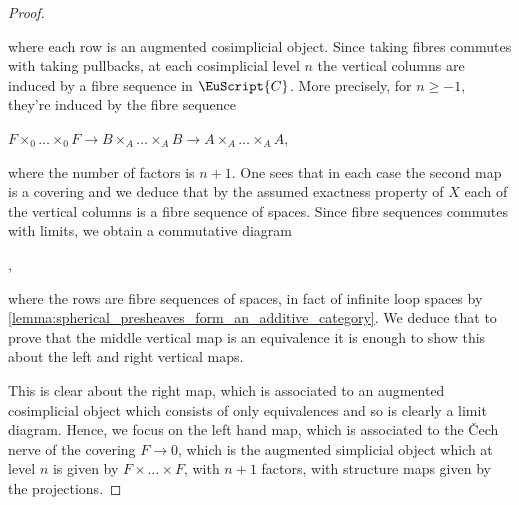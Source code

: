 \documentclass[oneside,a4paper]{amsart}
\newcommand{\euscr}[1]{\EuScript{#1}} %
\newcommand{\ccat}{\euscr{C}} %
\newcommand{\thickdelta}{\mathbf{\Delta}} %
\theoremstyle{plain}
\theoremstyle{definition}
\theoremstyle{remark}
\begin{document}
\begin{proof}
\begin{center}
\end{center}
where each row is an augmented cosimplicial object. Since taking fibres commutes with taking pullbacks, at each cosimplicial level $n$ the vertical columns are induced by a fibre sequence in $\ccat$. More precisely, for $n \geq -1$, they're induced by the fibre sequence 

\begin{center}
$F \times _{0} \ldots \times _{0} F \rightarrow B \times _{A} \ldots \times_{A} B \rightarrow A \times _{A} \ldots \times _{A} A$, 
\end{center}
where the number of factors is $n+1$. One sees that in each case the second map is a covering and we deduce that by the assumed exactness property of $X$ each of the vertical columns is a fibre sequence of spaces. Since fibre sequences commutes with limits, we obtain a commutative diagram 

\begin{center}
	,
\end{center}
where the rows are fibre sequences of spaces, in fact of infinite loop spaces by \cref{lemma:spherical_presheaves_form_an_additive_category}. We deduce that to prove that the middle vertical map is an equivalence it is enough to show this about the left and right vertical maps.

This is clear about the right map, which is associated to an augmented cosimplicial object which consists of only equivalences and so is clearly a limit diagram. Hence, we focus on the left hand map, which is associated to the \v{C}ech nerve of the covering $F \rightarrow 0$, which is the augmented simplicial object which at level $n$ is given by $F \times \ldots \times F$, with $n+1$ factors, with structure maps given by the projections. 


\end{proof}
\end{document}
